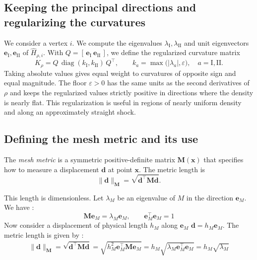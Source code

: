 \documentclass[11pt,a4paper]{article}
\begin{document}
\subsection{Keeping the principal directions and regularizing the curvatures}

We consider a vertex \(i\). We compute the eigenvalues \(\lambda_\mathrm{I},\lambda_\mathrm{II}\)
and unit eigenvectors \(\mathbf e_\mathrm{I},\mathbf e_\mathrm{II}\) of
\(\widehat H_{\rho,i}\). With \(Q=[\,\mathbf e_\mathrm{I}\ \mathbf e_\mathrm{II}\,]\), we define
the regularized curvature matrix
\begin{equation}
\label{eq: regCurv}
  K_\rho=Q\,\operatorname{diag}(k_\mathrm{I},k_\mathrm{II})\,Q^\top,
  \qquad
  k_a=\max\bigl(\lvert\lambda_a\rvert,\varepsilon\bigr),\quad a=\mathrm{I},\mathrm{II}.
\end{equation}
Taking absolute values gives equal weight to curvatures of opposite
sign and equal magnitude. The floor \(\varepsilon>0\) has the same
units as the second derivatives of \(\rho\) and keeps the regularized
values strictly positive in directions where the density is nearly
flat. This regularization is useful in regions of nearly uniform
density and along an approximately straight shock.

\subsection{Defining the mesh metric and its use}

The \emph{mesh metric} is a symmetric positive-definite matrix
\(\mathbf{M}(\mathbf x)\) that specifies how to measure a displacement
\(\mathbf d\) at point \(\mathbf x\). The metric length is
\begin{equation}
  \|\mathbf d\|_\mathbf{M}=\sqrt{\mathbf d^\top \mathbf{M}\mathbf d}.
\end{equation}



\noindent
This length is dimensionless. Let \(\lambda_M\) be an eigenvalue of \(M\)
in  the direction \(\mathbf e_M\). We have :
\begin{equation}
    \mathbf{M}\mathbf{e}_M
    = \lambda_M\mathbf{e}_M,
    \qquad
    \mathbf{e}_M^\top\mathbf{e}_M=1
\end{equation}
\noindent
Now consider a displacement of physical length \(h_M\) along \(\mathbf e_M\) $ \mathbf{d}=h_M\mathbf{e}_M$. The metric length is given by :
\begin{equation}
    \begin{aligned}
        \|\mathbf{d}\|_{\mathbf{M}}
        = \sqrt{\mathbf{d}^\top\mathbf{M}\mathbf{d}} = \sqrt{h_M^2\mathbf{e}_M^\top
            \mathbf{M}\mathbf{e}_M} = h_M\sqrt{\lambda_M
            \mathbf{e}_M^\top\mathbf{e}_M} = h_M\sqrt{\lambda_M}
    \end{aligned}
\end{equation}
\end{document}
